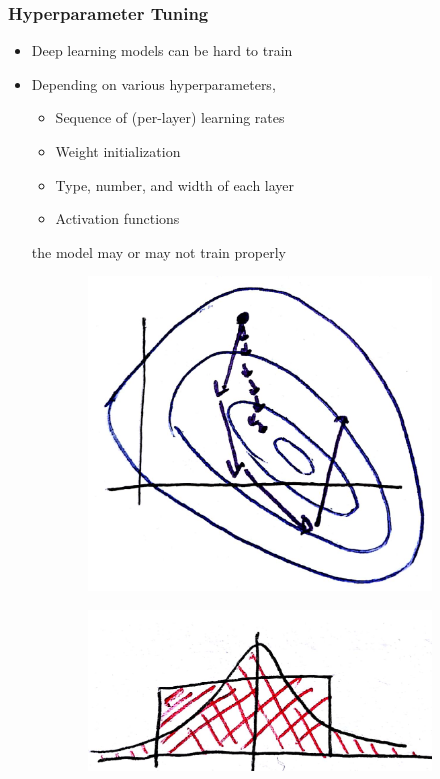 \documentclass[10pt,mathserif]{beamer}
\begin{document}
\begin{frame}
  \frametitle{Hyperparameter Tuning}
  \begin{itemize}
  \item Deep learning models can be hard to train
  \item Depending on various hyperparameters,
    \begin{itemize}
    \item Sequence of (per-layer) learning rates
    \item Weight initialization
    \item Type, number, and width of each layer
    \item Activation functions
    \end{itemize}
    the model may or may not train properly
  \end{itemize}
\begin{figure}[ht]
  \centering
    \begin{subfigure}{.2\paperwidth}
      \centering
      \includegraphics[width=0.17\paperwidth]{figure/learning_rate_effect}
    \end{subfigure}
    \begin{subfigure}{.2\paperwidth}
      \centering
      \includegraphics[width=0.17\paperwidth]{figure/weight_initialization}

\end{subfigure}
\end{figure}
\end{frame}
\end{document}
